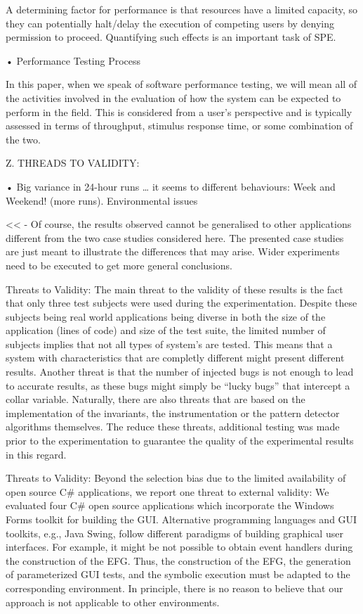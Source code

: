 \documentclass[runningheads,a4paper]{llncs}
\begin{document}
A determining factor for performance is that resources have a limited capacity,
so they can potentially halt/delay the execution of competing users by denying
permission to proceed. Quantifying such effects is an important task of SPE.

•	Performance Testing Process

In this paper, when we speak of software performance
testing, we will mean all of the activities involved in the
evaluation of how the system can be expected to perform in
the field. This is considered from a user's perspective and is
typically assessed in terms of throughput, stimulus response
time, or some combination of the two.

Z. THREADS TO VALIDITY:

•	Big variance in 24-hour runs … it seems to different behaviours: Week and
Weekend! (more runs). Environmental issues

<<
- Of course, the results observed cannot be generalised to other applications
different from the two case studies considered here. The presented case studies
are just meant to illustrate the differences that may arise. Wider experiments
need to be executed to get more general conclusions.

Threats to Validity: The main threat to the validity of these results is the fact that only 
three test subjects were used during the experimentation. Despite these subjects being
real world applications being diverse in both the size of the application (lines of
code) and size of the test suite, the limited number of subjects implies that not
all types of system’s are tested. This means that a system with characteristics
that are completly different might present different results.
Another threat is that the number of injected bugs is not enough to lead to
accurate results, as these bugs might simply be “lucky bugs” that intercept a
collar variable.
Naturally, there are also threats that are based on the implementation of the
invariants, the instrumentation or the pattern detector algorithms themselves.
The reduce these threats, additional testing was made prior to the experimentation
to guarantee the quality of the experimental results in this regard.

Threats to Validity: Beyond the selection bias due to the limited availability of open source 
C\# applications, we report one threat to external validity: We evaluated four
C\# open source applications which incorporate the Windows Forms toolkit for
building the GUI. Alternative programming languages and GUI toolkits, e.g., Java Swing,
follow different paradigms of building graphical user interfaces. For example, it
might be not possible to obtain event handlers during the construction of the
EFG. Thus, the construction of the EFG, the generation of parameterized GUI
tests, and the symbolic execution must be adapted to the corresponding environment.
In principle, there is no reason to believe that our approach is not
applicable to other environments.
\end{document}
